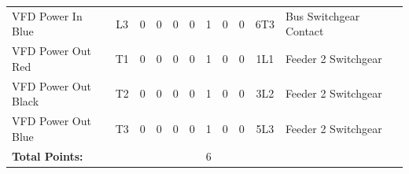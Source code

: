 \begin{table}[!htp]
{\begin{tabular}{lcccccccccll}
			VFD Power In Blue                 & L3                      & 0                                           & 0                                          & 0           & 0           & 1            & 0                & 0 & 6T3                          & Bus Switchgear Contact           &                \\
			VFD Power Out Red                 & T1                      & 0                                           & 0                                          & 0           & 0           & 1            & 0                & 0 & 1L1                          & Feeder 2 Switchgear              &                \\
			VFD Power Out Black               & T2                      & 0                                           & 0                                          & 0           & 0           & 1            & 0                & 0 & 3L2                          & Feeder 2 Switchgear              &                \\
			VFD Power Out Blue                & T3                      & 0                                           & 0                                          & 0           & 0           & 1            & 0                & 0 & 5L3                          & Feeder 2 Switchgear              &                \\ \midrule
			\textbf{Total Points:}            &                         &                                             &                                            &             &             & 6            &                  &   &                              &                                  &                \\ \bottomrule
		\end{tabular}
	}
\end{table}
